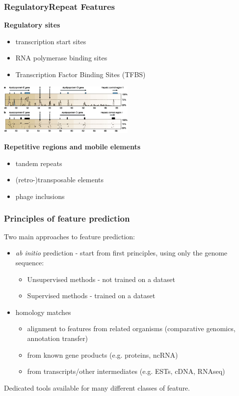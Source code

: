 \begin{frame}
  \frametitle{RegulatoryRepeat Features}
  \textbf{Regulatory sites}
  \begin{itemize}
    \item transcription start sites
    \item RNA polymerase binding sites
    \item Transcription Factor Binding Sites (TFBS)
  \end{itemize}
  \begin{center}
    \includegraphics[width=0.5\textwidth]{images/regulatory_sites}
  \end{center}
  \textbf{Repetitive regions and mobile elements}
  \begin{itemize}
    \item tandem repeats
    \item (retro-)transposable elements
    \item phage inclusions
  \end{itemize}  
\end{frame}

\begin{frame}
  \frametitle{Principles of feature prediction}
  Two main approaches to feature prediction:
  \begin{itemize}
    \item \textit{ab initio} prediction - start from first principles, using only the genome sequence: 
    \begin{itemize}
      \item Unsupervised methods - not trained on a dataset
      \item Supervised methods - trained on a dataset
    \end{itemize}
    \item homology matches
    \begin{itemize}
      \item alignment to features from related organisms (comparative genomics, annotation transfer)
      \item from known gene products (e.g. proteins, ncRNA)
      \item from transcripts/other intermediates (e.g. ESTs, cDNA, RNAseq)
    \end{itemize}
  \end{itemize}
  Dedicated tools available for many different classes of feature.
\end{frame}